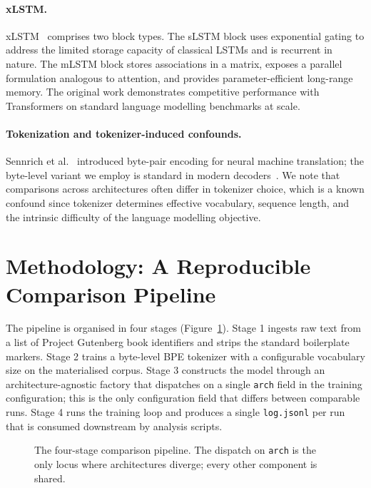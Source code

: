 \documentclass[11pt]{article}
\begin{document}
\paragraph{xLSTM.}
xLSTM~\cite{beck2024} comprises two block types. The sLSTM block uses
exponential gating to address the limited storage capacity of classical
LSTMs and is recurrent in nature. The mLSTM block stores associations in
a matrix, exposes a parallel formulation analogous to attention, and
provides parameter-efficient long-range memory. The original work
demonstrates competitive performance with Transformers on standard
language modelling benchmarks at scale.

\paragraph{Tokenization and tokenizer-induced confounds.}
Sennrich et al.~\cite{sennrich2016} introduced byte-pair encoding for
neural machine translation; the byte-level variant we employ is standard
in modern decoders~\cite{radford2019}. We note that comparisons across
architectures often differ in tokenizer choice, which is a known confound
since tokenizer determines effective vocabulary, sequence length, and the
intrinsic difficulty of the language modelling objective.

\section{Methodology: A Reproducible Comparison Pipeline}

The pipeline is organised in four stages
(Figure~\ref{fig:pipeline}). Stage 1 ingests raw text from a list of
Project Gutenberg book identifiers and strips the standard boilerplate
markers. Stage 2 trains a byte-level BPE tokenizer with a configurable
vocabulary size on the materialised corpus. Stage 3 constructs the model
through an architecture-agnostic factory that dispatches on a single
\texttt{arch} field in the training configuration; this is the only
configuration field that differs between comparable runs. Stage 4 runs the
training loop and produces a single \texttt{log.jsonl} per run that is
consumed downstream by analysis scripts.

\begin{figure}[h]
\centering
{}
\caption{The four-stage comparison pipeline. The dispatch on
  \texttt{arch} is the only locus where architectures diverge; every
  other component is shared.}
\label{fig:pipeline}
\end{figure}
\end{document}
